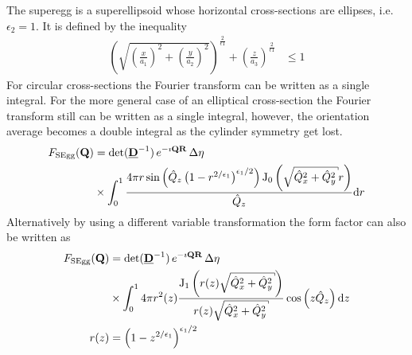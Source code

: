 The superegg is a superellipsoid whose horizontal cross-sections are ellipses, i.e. $\epsilon_2=1$. It is defined by the inequality \cite{WeisssteinSuperEgg}
\begin{align}
\label{eq:superegg_implicit}
   \left(\sqrt{\left(\frac{x}{a_1}\right)^2+\left(\frac{y}{a_2}\right)^2}\right)^{\frac{2}{\epsilon1}} + \left(\frac{z}{a_3}\right)^{\frac{2}{\epsilon1}} & \leq 1
\end{align}
For circular cross-sections the Fourier transform \cite{Maric2017} can be written as a single integral. For the more general case of an elliptical cross-section the Fourier transform still can be written as a single integral, however, the orientation average becomes a double integral as the cylinder symmetry get lost.
\begin{align}
F_\mathrm{SEgg}(\B{Q}) &=
\det(\M{D}^{-1})\, e^{-\imath\B{QR}}\, \Delta\eta\,  \nonumber \\
 &\times \int_0^1 \frac{4 \pi  r \sin \left(\hat{Q}_z \left(1-r^{2/\epsilon_1}\right)^{\epsilon_1/2}\right) \operatorname{J}_0\left(\sqrt{\hat{Q}_x^2+\hat{Q}_y^2}
   r\right)}{\hat{Q}_z} \mathrm{d}r
\end{align}
Alternatively by using a different variable transformation the form factor can also be written as \cite{Maric2017}
\begin{align}
F_\mathrm{SEgg}(\B{Q}) &=
\det(\M{D}^{-1})\, e^{-\imath\B{QR}}\, \Delta\eta\,  \nonumber \\
 &\times \int_0^1 4 \pi  r^2(z) \frac{\operatorname{J}_1\left(r(z)\sqrt{\hat{Q}_x^2+\hat{Q}_y^2}\right) }{r(z)\sqrt{\hat{Q}_x^2+\hat{Q}_y^2}} \cos\left(z\hat{Q}_z\right)  \mathrm{d}z \\
 r(z) &=\left(1-z^{2/\epsilon_1}\right)^{\epsilon_1/2}
\end{align}


